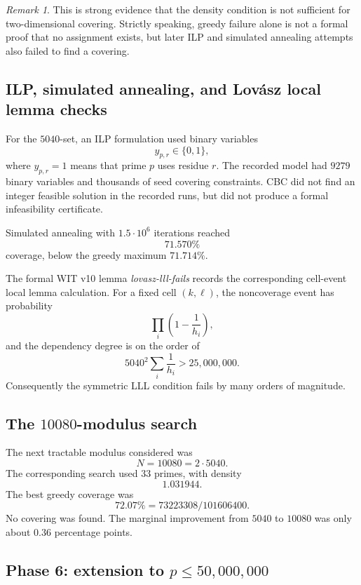 \documentclass[11pt]{article}
\theoremstyle{definition}
\theoremstyle{remark}
\newtheorem{remark}[theorem]{Remark}
\begin{document}
\begin{remark}
This is strong evidence that the density condition is not sufficient for
two-dimensional covering.  Strictly speaking, greedy failure alone is not a
formal proof that no assignment exists, but later ILP and simulated annealing
attempts also failed to find a covering.
\end{remark}

\subsection{ILP, simulated annealing, and Lov\'asz local lemma checks}

For the \(5040\)-set, an ILP formulation used binary variables
\[
        y_{p,r}\in\{0,1\},
\]
where \(y_{p,r}=1\) means that prime \(p\) uses residue \(r\).  The recorded
model had \(9279\) binary variables and thousands of seed covering constraints.
CBC did not find an integer feasible solution in the recorded runs, but did
not produce a formal infeasibility certificate.

Simulated annealing with \(1.5\cdot 10^6\) iterations reached
\[
        71.570\%
\]
coverage, below the greedy maximum \(71.714\%\).

The formal WIT v10 lemma \emph{lovasz-lll-fails} records the corresponding
cell-event local lemma calculation.  For a fixed cell \((k,\ell)\), the
noncoverage event has probability
\[
        \prod_i\left(1-\frac1{h_i}\right),
\]
and the dependency degree is on the order of
\[
        5040^2\sum_i\frac1{h_i}>25{,}000{,}000.
\]
Consequently the symmetric LLL condition fails by many orders of magnitude.

\subsection{The \(10080\)-modulus search}

The next tractable modulus considered was
\[
        N=10080=2\cdot 5040.
\]
The corresponding search used 33 primes, with density
\[
        1.031944.
\]
The best greedy coverage was
\[
        72.07\%=
        73223308/101606400.
\]
No covering was found.  The marginal improvement from \(5040\) to \(10080\) was
only about \(0.36\) percentage points.

\subsection{Phase 6: extension to \(p\leq 50{,}000{,}000\)}
\end{document}
